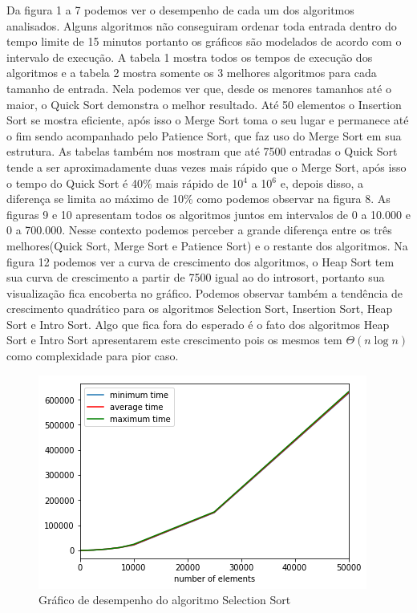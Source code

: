 \documentclass[a4paper,12pt]{scrartcl}
\begin{document}
\newline Da figura 1 a 7 podemos ver o desempenho de cada um dos algoritmos analisados. Alguns algoritmos não conseguiram ordenar toda entrada dentro do tempo limite de 15 minutos portanto os gráficos são modelados de acordo com o intervalo de execução.
\newline A tabela 1 mostra todos os tempos de execução dos algoritmos e a tabela 2 mostra somente os 3 melhores algoritmos para cada tamanho de entrada. Nela podemos ver que, desde os menores tamanhos até o maior, o Quick Sort demonstra o melhor resultado. Até 50 elementos o Insertion Sort se mostra eficiente, após isso o Merge Sort toma o seu lugar e permanece até o fim sendo acompanhado pelo Patience Sort, que faz uso do Merge Sort em sua estrutura.
\newline As tabelas também nos mostram que até 7500 entradas o Quick Sort tende a ser aproximadamente duas vezes mais rápido que o Merge Sort, após isso o tempo do Quick Sort é 40\% mais rápido de 10$^{4}$ a 10$^{6}$ e, depois disso, a diferença se limita ao máximo de 10\% como podemos observar na figura 8.
\newline As figuras 9 e 10 apresentam todos os algoritmos juntos em intervalos de 0 a 10.000 e 0 a 700.000. Nesse contexto podemos perceber a grande diferença entre os três melhores(Quick Sort, Merge Sort e Patience Sort) e o restante dos algoritmos.
\newline Na figura 12 podemos ver a curva de crescimento dos algoritmos, o Heap Sort tem sua curva de crescimento a partir de 7500 igual ao do introsort, portanto sua visualização fica encoberta no gráfico. Podemos observar também a tendência de crescimento quadrático para os algoritmos Selection Sort, Insertion Sort, Heap Sort e Intro Sort. Algo que fica fora do esperado é o fato dos algoritmos Heap Sort e Intro Sort apresentarem este crescimento pois os mesmos tem $\Theta(n\log n)$ como complexidade para pior caso.


\begin{figure}[H]
\centering
\includegraphics[scale=.75]{images/selectionsort.png}
\caption{Gráfico de desempenho do algoritmo Selection Sort}
\label{mapaSelection}
\end{figure}
\end{document}
